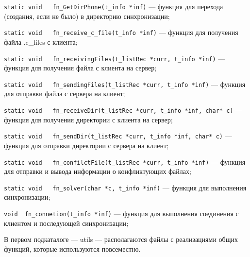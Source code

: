 \begin{enumerate}
	\verb|static void	fn_GetDirPhone(t_info *inf)| --- функция для перехода (создания, если не было) в директорию синхронизации;
	
	\verb|static void	fn_receive_c_file(t_info *inf)| --- функция для получения файла .c\_files с клиента;
	
	\verb|static void	fn_receivingFiles(t_listRec *curr, t_info *inf)| --- функция для получения файла с клиента на сервер;
	
	\verb|static void	fn_sendingFiles(t_listRec *curr, t_info *inf)| --- функция для отправки файла с сервера на клиент;
	
	\verb|static void	fn_receiveDir(t_listRec *curr, t_info *inf, char* c)| --- функция для получения директории с клиента на сервер;
	
	\verb|static void	fn_sendDir(t_listRec *curr, t_info *inf, char* c)| --- функция для отправки директории с сервера на клиент;
	
	\verb|static void	fn_confilctFile(t_listRec *curr, t_info *inf)| --- функция для отправки и вывода информации о конфликтующих файлах;
	
	\verb|static void	fn_solver(char *c, t_info *inf)| --- функция для выполнения синхронизации;
	
	\verb|void	fn_connetion(t_info *inf)| --- функция для выполнения соединения с клиентом и последующей синхронизации;
\end{enumerate}
В первом подкаталоге --- utils --- располагаются файлы с реализациями общих функций, которые используются повсеместно.

